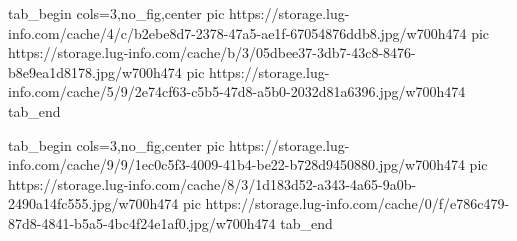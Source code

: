  
 
 
 
 

\ifcmt
  tab_begin cols=3,no_fig,center
     pic https://storage.lug-info.com/cache/4/c/b2ebe8d7-2378-47a5-ae1f-67054876ddb8.jpg/w700h474%
		 pic https://storage.lug-info.com/cache/b/3/05dbee37-3db7-43c8-8476-b8e9ea1d8178.jpg/w700h474%
		 pic https://storage.lug-info.com/cache/5/9/2e74cf63-c5b5-47d8-a5b0-2032d81a6396.jpg/w700h474%
  tab_end

  tab_begin cols=3,no_fig,center
		 pic https://storage.lug-info.com/cache/9/9/1ec0c5f3-4009-41b4-be22-b728d9450880.jpg/w700h474%
		 pic https://storage.lug-info.com/cache/8/3/1d183d52-a343-4a65-9a0b-2490a14fc555.jpg/w700h474%
		 pic https://storage.lug-info.com/cache/0/f/e786c479-87d8-4841-b5a5-4bc4f24e1af0.jpg/w700h474%
  tab_end
\fi
